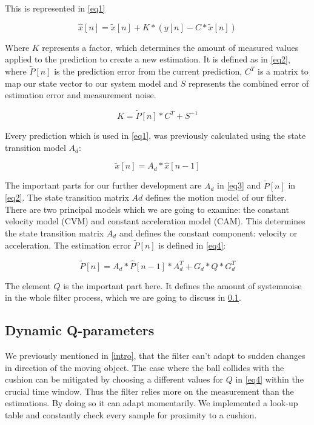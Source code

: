 \documentclass[notitlepage, a4paper, 11pt]{scrartcl}
\begin{document}
\begin{multicols}{2}
This is represented in \cref{eq1}

\begin{equation} 
    \label{eq1}
    \hat{x}[n]=\tilde{x}[n]+K*(y[n]-C*\tilde{x}[n])
\end{equation}

Where $K$ represents a factor, which determines the amount of measured values applied to the prediction to create a new estimation. It is defined as in \cref{eq2}, 
where $\tilde{P}[n]$ is the prediction error from the current prediction, $C^T$ is a matrix to map our state vector to our system model and $S$ represents the combined error of estimation error and measurement noise.

\begin{equation} 
    \label{eq2}
    K=\tilde{P}[n]*C^T+S^{-1}
\end{equation}

Every prediction which is used in \cref{eq1}, was previously calculated using the state transition model $A_d$:

\begin{equation} 
    \label{eq3}
    \tilde{x}[n]=A_d*\hat{x}[n-1]
\end{equation}

The important parts for our further development are $A_d$ in \cref{eq3} and $\tilde{P}[n]$ in \cref{eq2}. The state transition matrix $Ad$ defines the motion model of our filter.
There are two principal models which we are going to examine: 
the constant velocity model (CVM) and constant acceleration model (CAM). This determines the state transition matrix $A_d$ and defines the constant component: velocity or acceleration.
The estimation error $\tilde{P}[n]$ is defined in \cref{eq4}:

\begin{equation} 
    \label{eq4}
    \tilde{P}[n]=A_d*\hat{P}[n-1]*A_d^T+G_d*Q*G_d^T
\end{equation}

The element $Q$ is the important part here. It defines the amount of systemnoise in the whole filter process, which we are going to discuss in \cref{dynamic-q}.

\subsection{Dynamic Q-parameters} \label{dynamic-q}

We previously mentioned in \cref{intro}, that the filter can't adapt to sudden changes in direction of the moving object. 
The case where the ball collides with the cushion can be mitigated by choosing a different values for $Q$ in \cref{eq4} within the crucial time window.
Thus the filter relies more on the measurement than the estimations. By doing so it can adapt momentarily.
We implemented a look-up table and constantly check every sample for proximity to a cushion.


\end{multicols}
\end{document}
